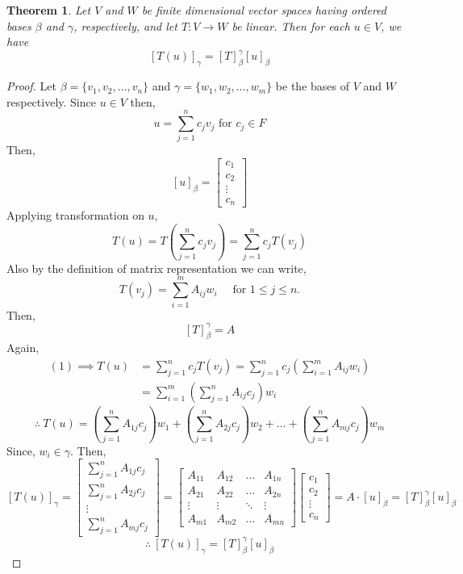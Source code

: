 \documentclass[12pt, a4paper]{article}
\newtheorem{theorem}{Theorem}[section]
\theoremstyle{definition}
\theoremstyle{remark}
\begin{document}
\begin{theorem}
    Let $V$ and $W$ be finite dimensional vector spaces having ordered bases $\beta$ and $\gamma$, respectively, and let $T:V \to W$ be linear. Then for each $u \in V$, we have
    \[
    [T(u)]_\gamma = [T]_\beta^\gamma [u]_\beta
    \]
\end{theorem}

\begin{proof}
    Let $\beta = \{v_1, v_2, \dots, v_n\}$ and $\gamma = \{w_1, w_2, \dots, w_m\}$ be the bases of $V$ and $W$ respectively. Since $u \in V$ then,
    \[ u = \sum_{j=1}^{n} c_j v_j \text{ for } c_j \in F \]
    Then,
    \[ [u]_\beta = \begin{bmatrix} c_1 \\ c_2 \\ \vdots \\ c_n \end{bmatrix} \]
    Applying transformation on $u$,
    \[ T(u) = T\left( \sum_{j=1}^{n} c_j v_j \right) = \sum_{j=1}^{n} c_j T(v_j) \tag{1} \]
    Also by the definition of matrix representation we can write,
    \[ T(v_j) = \sum_{i=1}^{m} A_{ij} w_i \quad \text{ for } 1 \le j \le n. \]
    Then,
    \[ [T]_\beta^\gamma = A \]
    Again,
    \begin{align*}
    (1) \implies T(u) &= \sum_{j=1}^{n} c_j T(v_j) = \sum_{j=1}^{n} c_j \left( \sum_{i=1}^{m} A_{ij} w_i \right) \\
    &= \sum_{i=1}^{m} \left( \sum_{j=1}^{n} A_{ij} c_j \right) w_i
    \end{align*}
    \[ \therefore \ T(u) = \left( \sum_{j=1}^{n} A_{1j} c_j \right) w_1 + \left( \sum_{j=1}^{n} A_{2j} c_j \right) w_2 + \dots + \left( \sum_{j=1}^{n} A_{mj} c_j \right) w_m \]
    Since, $w_i \in \gamma$. Then,
    \[ [T(u)]_\gamma = \begin{bmatrix} \displaystyle\sum_{j=1}^{n} A_{1j} c_j \\ \displaystyle\sum_{j=1}^{n} A_{2j} c_j \\ \vdots \\ \displaystyle\sum_{j=1}^{n} A_{mj} c_j \end{bmatrix} = \begin{bmatrix} A_{11} & A_{12} & \dots & A_{1n} \\ A_{21} & A_{22} & \dots & A_{2n} \\ \vdots & \vdots & \ddots & \vdots \\ A_{m1} & A_{m2} & \dots & A_{mn} \end{bmatrix} \begin{bmatrix} c_1 \\ c_2 \\ \vdots \\ c_n \end{bmatrix} = A \cdot [u]_\beta = [T]_\beta^\gamma [u]_\beta \]
    \[ \therefore \ [T(u)]_\gamma = [T]_\beta^\gamma [u]_\beta \]
\end{proof}
\end{document}
